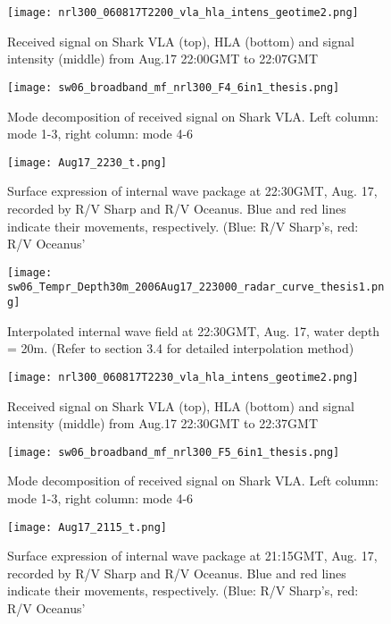 \begin{figure}[H]
  \centering
  \texttt{[image: nrl300\_060817T2200\_vla\_hla\_intens\_geotime2.png]}
  \caption{Received signal on Shark VLA (top), HLA (bottom) and signal intensity (middle) from Aug.17 22:00GMT to 22:07GMT }\label{fig:a2130}
\end{figure}

\begin{figure}[H]
  \centering
  \texttt{[image: sw06\_broadband\_mf\_nrl300\_F4\_6in1\_thesis.png]}
  \caption{Mode decomposition of received signal on Shark VLA. 
    Left column: mode 1-3, right column: mode 4-6 }\label{fig:m2130}
\end{figure}


\begin{figure}[H]
  \centering
  \texttt{[image: Aug17\_2230\_t.png]}
  \caption{Surface expression of internal wave package at 22:30GMT, Aug. 17, recorded by R/V Sharp and R/V Oceanus. Blue and red lines indicate their movements, respectively. (Blue: R/V Sharp's, red: R/V Oceanus'}\label{fig:r2130_r}
\end{figure}

\begin{figure}[H]
 \centering
 \texttt{[image: sw06\_Tempr\_Depth30m\_2006Aug17\_223000\_radar\_curve\_thesis1.png]}
 \caption{Interpolated internal wave field at 22:30GMT, Aug. 17, water depth = 20m. (Refer to section 3.4 for detailed interpolation method)}\label{fig:r2130_i}
\end{figure}

\begin{figure}[H]
  \centering
  \texttt{[image: nrl300\_060817T2230\_vla\_hla\_intens\_geotime2.png]}
  \caption{Received signal on Shark VLA (top), HLA (bottom) and signal intensity (middle) from Aug.17 22:30GMT to 22:37GMT }\label{fig:a2130}
\end{figure}

\begin{figure}[h]
\centering
 \texttt{[image: sw06\_broadband\_mf\_nrl300\_F5\_6in1\_thesis.png]}
  \caption{Mode decomposition of received signal on Shark VLA. 
    Left column: mode 1-3, right column: mode 4-6 }\label{fig:m2130}
\end{figure}


\begin{figure}[H]
  \centering
  \texttt{[image: Aug17\_2115\_t.png]}
  \caption{Surface expression of internal wave package at 21:15GMT, Aug. 17, recorded by R/V Sharp and R/V Oceanus. Blue and red lines indicate their movements, respectively. (Blue: R/V Sharp's, red: R/V Oceanus'}\label{fig:r2130_r}
\end{figure}

